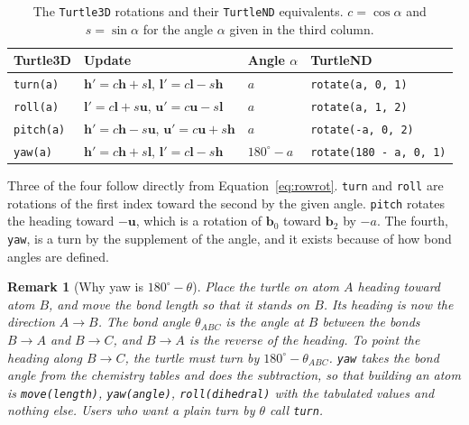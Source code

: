 \documentclass[11pt,letterpaper]{article}
\newtheorem{remark}{Remark}[section]
\newcommand{\basis}{\mathbf{b}}
\newcommand{\code}[1]{\texttt{#1}}
\begin{document}
\begin{table}[h]
\centering
\caption{The \code{Turtle3D} rotations and their \code{TurtleND}
equivalents. $c = \cos\alpha$ and $s = \sin\alpha$ for the angle
$\alpha$ given in the third column.}
\label{tab:conventions}
\begin{tabular}{@{}llll@{}}
\toprule
\textbf{Turtle3D} & \textbf{Update} & \textbf{Angle} $\alpha$ & \textbf{TurtleND} \\
\midrule
\code{turn(a)}  & $\mathbf{h}' = c\mathbf{h} + s\mathbf{l}$, $\mathbf{l}' = c\mathbf{l} - s\mathbf{h}$ & $a$ & \code{rotate(a, 0, 1)} \\
\code{roll(a)}  & $\mathbf{l}' = c\mathbf{l} + s\mathbf{u}$, $\mathbf{u}' = c\mathbf{u} - s\mathbf{l}$ & $a$ & \code{rotate(a, 1, 2)} \\
\code{pitch(a)} & $\mathbf{h}' = c\mathbf{h} - s\mathbf{u}$, $\mathbf{u}' = c\mathbf{u} + s\mathbf{h}$ & $a$ & \code{rotate(-a, 0, 2)} \\
\code{yaw(a)}   & $\mathbf{h}' = c\mathbf{h} + s\mathbf{l}$, $\mathbf{l}' = c\mathbf{l} - s\mathbf{h}$ & $180^\circ - a$ & \code{rotate(180 - a, 0, 1)} \\
\bottomrule
\end{tabular}
\end{table}

Three of the four follow directly from Equation~\eqref{eq:rowrot}.
\code{turn} and \code{roll} are rotations of the first index toward the
second by the given angle. \code{pitch} rotates the heading toward
$-\mathbf{u}$, which is a rotation of $\basis_0$ toward $\basis_2$ by
$-a$. The fourth, \code{yaw}, is a turn by the supplement of the
angle, and it exists because of how bond angles are defined.

\begin{remark}[Why yaw is $180^\circ - \theta$]
\label{rem:yaw}
Place the turtle on atom $A$ heading toward atom $B$, and move the bond
length so that it stands on $B$. Its heading is now the direction
$A \to B$. The bond angle $\theta_{ABC}$ is the angle at $B$ between the
bonds $B \to A$ and $B \to C$, and $B \to A$ is the reverse of the
heading. To point the heading along $B \to C$, the turtle must turn by
$180^\circ - \theta_{ABC}$. \code{yaw} takes the bond angle from the
chemistry tables and does the subtraction, so that building an atom is
\code{move(length)}, \code{yaw(angle)}, \code{roll(dihedral)} with the
tabulated values and nothing else. Users who want a plain turn by
$\theta$ call \code{turn}.
\end{remark}
\end{document}
